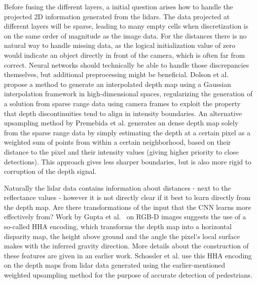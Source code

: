 Before fusing the different layers, a initial question arises how to handle the projected 2D information generated from the lidars. The data projected at different layers will be sparse, leading to many empty cells when discretization is on the same order of magnitude as the image data. For the distances there is no natural way to handle missing data, as the logical initialization value of zero would indicate an object directly in front of the camera, which is often far from correct. Neural networks should technically be able to handle those discrepancies themselves, but additional preprocessing might be beneficial. Dolson et al.~\cite{dolson2010} propose a method to generate an interpolated depth map using a Gaussian interpolation framework in high-dimensional spaces, regularizing the generation of a solution from sparse range data using camera frames to exploit the property that depth discontinuities tend to align in intensity boundaries. An alternative upsampling method by Premebida et al.\cite{premebida2014} generates an dense depth map solely from the sparse range data by simply estimating the depth at a certain pixel as a weighted sum of points from within a certain neighborhood, based on their distance to the pixel and their intensity values (giving higher priority to close detections). This approach gives less sharper boundaries, but is also more rigid to corruption of the depth signal.  

Naturally the lidar data contains information about distances - next to the reflectance values - however it is not directly clear if it best to learn directly from the depth map. Are there transformations of the input that the CNN learns more effectively from? Work by Gupta et al.~\cite{gupta2014} on RGB-D images suggests the use of a so-called HHA encoding, which transforms the depth map into a horizontal disparity map, the height above ground and the angle the pixel's local surface makes with the inferred gravity direction. More details about the construction of these features are given in an earlier work\cite{gupta2013}. Schossler et al.\cite{schlosser2016} use this HHA encoding on the depth maps from lidar data generated using the earlier-mentioned weighted upsampling method\cite{premebida2014} for the purpose of accurate detection of pedestrians.
